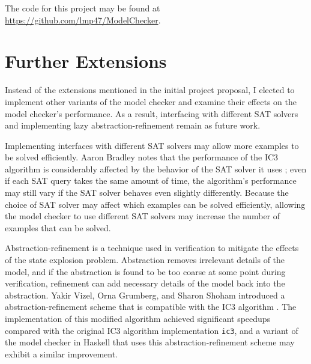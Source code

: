 \documentclass[12pt,a4paper,twoside,openright]{report}
\begin{document}
{{The code for this project may be found at \url{https://github.com/lmp47/ModelChecker}.

\section{Further Extensions}
\label{conc:extensions}

Instead of the extensions mentioned in the initial project proposal,
I elected to implement other variants of the model checker and examine their
effects on the model checker's performance.
As a result, interfacing with different SAT solvers and implementing lazy
abstraction-refinement remain as future work.

Implementing interfaces with different SAT solvers may allow more examples to be solved efficiently.
Aaron Bradley notes that the performance of the IC3 algorithm is considerably affected
by the behavior of the SAT solver it uses \cite{bradley12}; even if each SAT query takes the same amount of
time, the algorithm's performance may still vary if the SAT solver behaves even slightly differently.
Because the choice of SAT solver may affect which examples can be solved efficiently, allowing the model
checker to use different SAT solvers may increase the number of examples that can be solved.

Abstraction-refinement is a technique used in verification to mitigate the effects
of the state explosion problem. Abstraction removes irrelevant details of the model,
and if the abstraction is found to be too coarse at some point during verification,
refinement can add necessary details of the model back into the abstraction.
Yakir Vizel, Orna Grumberg, and Sharon Shoham introduced a abstraction-refinement
scheme that is compatible with the IC3 algorithm \cite{vizel12}. The implementation
of this modified algorithm achieved significant speedups compared with the
original IC3 algorithm implementation \verb,ic3,, and a variant
of the model checker in Haskell that uses this abstraction-refinement scheme may 
exhibit a similar improvement.



\appendix

}}
\end{document}
